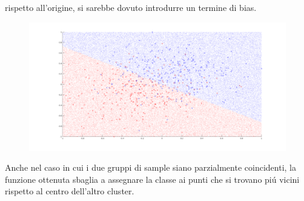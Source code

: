 \documentclass[12pt]{article}
\begin{document}
rispetto all'origine, si sarebbe dovuto introdurre un termine di bias.
\begin{figure}[H]
  \centering
  \includegraphics[width=\textwidth]{images/LinearBinaryClassifier2}
\end{figure}
Anche nel caso in cui i due gruppi di sample siano parzialmente coincidenti,
la funzione ottenuta sbaglia a assegnare la classe ai punti che si trovano piú vicini
rispetto al centro dell'altro cluster.
\end{document}
